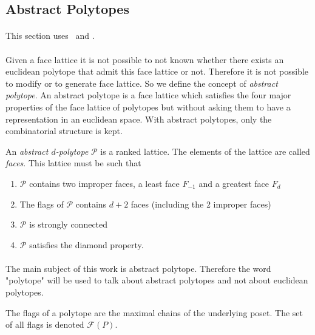 \subsection{Abstract Polytopes}

\paragraph{}
This section uses~\cite{incidenceGeometry} and \cite{abstractRegularPolytopes}.

\paragraph{}
Given a face lattice it is not possible to not known whether there exists an euclidean polytope that admit this face lattice or not. Therefore it is not possible to modify or to generate face lattice. So we define the concept of \textit{abstract polytope}. An abstract polytope is a face lattice which satisfies the four major properties of the face lattice of polytopes but without asking them to have a representation in an euclidean space. With abstract polytopes, only the combinatorial structure is kept.

\begin{definition}
  An \textit{abstract $d$-polytope} $\mathcal P$ is a ranked lattice. The elements of the lattice are called \textit{faces}. This lattice must be such that
  \begin{enumerate}
    \item $\mathcal P$ contains two improper faces, a least face $F_{-1}$ and a greatest face $F_d$
    \item The flags of $\mathcal P$ contains $d + 2$ faces (including the 2 improper faces)
    \item $\mathcal P$ is strongly connected
    \item $\mathcal P$ satisfies the diamond property.
  \end{enumerate}
\end{definition}

\paragraph{}
The main subject of this work is abstract polytope. Therefore the word "polytope" will be used to talk about abstract polytopes and not about euclidean polytopes.

\begin{definition}
  The flags of a polytope are the maximal chains of the underlying poset. The set of all flags is denoted $\mathcal F(P)$.
\end{definition}


